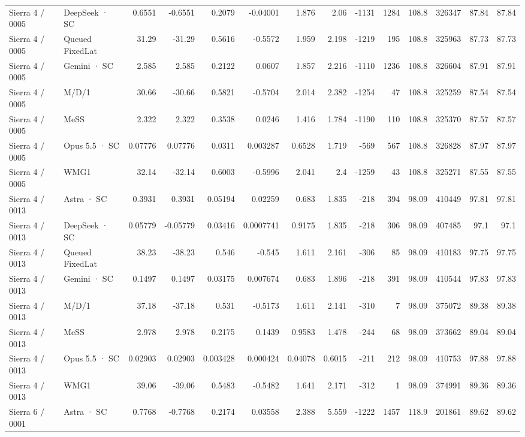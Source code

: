 \begin{tabular}{llrrrrrrrrrrrr}
Sierra 4 / 0005 & DeepSeek · SC & 0.6551 & -0.6551 & 0.2079 & -0.04001 & 1.876 & 2.06 & -1131 & 1284 & 108.8 & 326347 & 87.84 & 87.84 \\
Sierra 4 / 0005 & Queued FixedLat & 31.29 & -31.29 & 0.5616 & -0.5572 & 1.959 & 2.198 & -1219 & 195 & 108.8 & 325963 & 87.73 & 87.73 \\
Sierra 4 / 0005 & Gemini · SC & 2.585 & 2.585 & 0.2122 & 0.0607 & 1.857 & 2.216 & -1110 & 1236 & 108.8 & 326604 & 87.91 & 87.91 \\
Sierra 4 / 0005 & M/D/1 & 30.66 & -30.66 & 0.5821 & -0.5704 & 2.014 & 2.382 & -1254 & 47 & 108.8 & 325259 & 87.54 & 87.54 \\
Sierra 4 / 0005 & MeSS & 2.322 & 2.322 & 0.3538 & 0.0246 & 1.416 & 1.784 & -1190 & 110 & 108.8 & 325370 & 87.57 & 87.57 \\
Sierra 4 / 0005 & Opus 5.5 · SC & 0.07776 & 0.07776 & 0.0311 & 0.003287 & 0.6528 & 1.719 & -569 & 567 & 108.8 & 326828 & 87.97 & 87.97 \\
Sierra 4 / 0005 & WMG1 & 32.14 & -32.14 & 0.6003 & -0.5996 & 2.041 & 2.4 & -1259 & 43 & 108.8 & 325271 & 87.55 & 87.55 \\
Sierra 4 / 0013 & Astra · SC & 0.3931 & 0.3931 & 0.05194 & 0.02259 & 0.683 & 1.835 & -218 & 394 & 98.09 & 410449 & 97.81 & 97.81 \\
Sierra 4 / 0013 & DeepSeek · SC & 0.05779 & -0.05779 & 0.03416 & 0.0007741 & 0.9175 & 1.835 & -218 & 306 & 98.09 & 407485 & 97.1 & 97.1 \\
Sierra 4 / 0013 & Queued FixedLat & 38.23 & -38.23 & 0.546 & -0.545 & 1.611 & 2.161 & -306 & 85 & 98.09 & 410183 & 97.75 & 97.75 \\
Sierra 4 / 0013 & Gemini · SC & 0.1497 & 0.1497 & 0.03175 & 0.007674 & 0.683 & 1.896 & -218 & 391 & 98.09 & 410544 & 97.83 & 97.83 \\
Sierra 4 / 0013 & M/D/1 & 37.18 & -37.18 & 0.531 & -0.5173 & 1.611 & 2.141 & -310 & 7 & 98.09 & 375072 & 89.38 & 89.38 \\
Sierra 4 / 0013 & MeSS & 2.978 & 2.978 & 0.2175 & 0.1439 & 0.9583 & 1.478 & -244 & 68 & 98.09 & 373662 & 89.04 & 89.04 \\
Sierra 4 / 0013 & Opus 5.5 · SC & 0.02903 & 0.02903 & 0.003428 & 0.000424 & 0.04078 & 0.6015 & -211 & 212 & 98.09 & 410753 & 97.88 & 97.88 \\
Sierra 4 / 0013 & WMG1 & 39.06 & -39.06 & 0.5483 & -0.5482 & 1.641 & 2.171 & -312 & 1 & 98.09 & 374991 & 89.36 & 89.36 \\
Sierra 6 / 0001 & Astra · SC & 0.7768 & -0.7768 & 0.2174 & 0.03558 & 2.388 & 5.559 & -1222 & 1457 & 118.9 & 201861 & 89.62 & 89.62 \\

\end{tabular}
